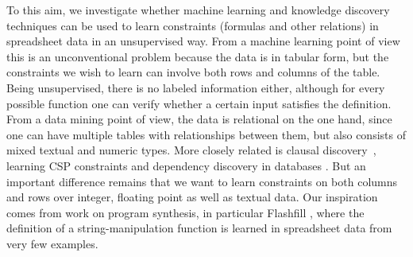 To this aim,  we investigate whether machine learning and knowledge discovery techniques can be used to learn constraints (formulas and other relations) in spreadsheet data in an unsupervised way.
From a machine learning point of view this is an unconventional problem because the data is in tabular form, but the constraints we wish to learn can involve both rows and columns of the table. Being unsupervised, there is no labeled information either, although for every possible function one can verify whether a certain input satisfies the definition.
From a data mining point of view, the data is relational on the one hand, since one can have multiple tables with relationships between them, but also consists of mixed textual and numeric types. More closely related is clausal discovery~\cite{claudien,lallouet}, learning CSP constraints \cite{QUACQ,Conacq,modelseeker} and dependency discovery in databases \cite{savnik}. But an important difference remains that we want to learn constraints on both columns and rows over integer, floating point as well as textual data.
Our inspiration comes from work on program synthesis, in particular Flashfill \cite{flashfill}, where the definition of a string-manipulation function is learned in spreadsheet data from very few examples.


